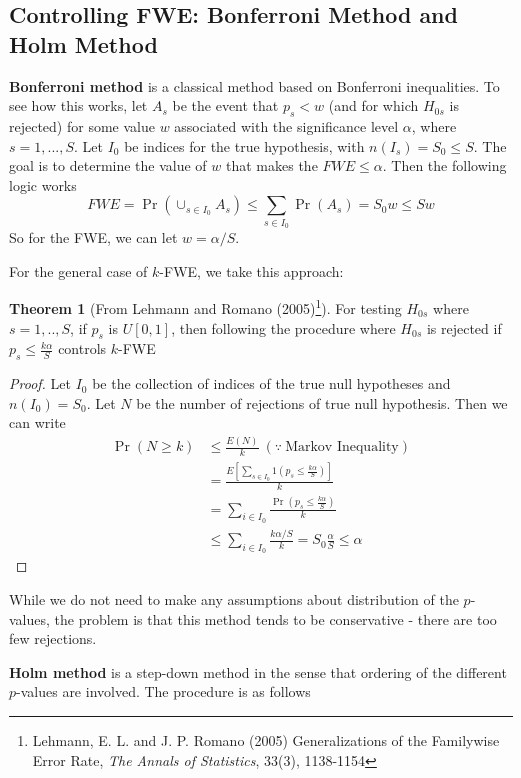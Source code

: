 \documentclass[12pt]{article}
\theoremstyle{definition}
\theoremstyle{property}
\theoremstyle{assumption}
\theoremstyle{example}
\theoremstyle{comment}
\newtheorem{theorem}{Theorem}[section]
\begin{document}
\subsection{Controlling FWE: Bonferroni Method and Holm Method}\textbf{Bonferroni method} is a classical method based on Bonferroni inequalities. To see how this works, let $A_s$ be the event that $p_s<w$ (and for which $H_{0s}$ is rejected) for some value $w$ associated with the significance level $\alpha$, where $s=1,...,S$. Let $I_0$ be indices for the true hypothesis, with $n(I_s)=S_0\leq S.$ The goal is to determine the value of $w$ that makes the $FWE\leq\alpha$.  Then the following logic works
\[
FWE = \Pr(\cup_{s\in I_0}A_s)\leq \sum_{s\in I_0}\Pr(A_s) = S_0 w \leq S w
\]
So for the FWE, we can let $w=\alpha/S$. \par
 For the general case of $k$-FWE, we take this approach:
\begin{mdframed}[backgroundcolor=green!5] 
\begin{theorem}[From Lehmann and Romano (2005)\footnote{Lehmann, E. L. and J. P. Romano (2005) Generalizations of the Familywise Error Rate, \textit{The Annals of Statistics}, 33(3), 1138-1154}]  For testing $H_{0s}$ where $s=1,..,S$, if $p_s$ is $U[0,1]$, then following the procedure where $H_{0s}$ is rejected if $p_s\leq \frac{k\alpha}{S}$ controls $k$-FWE
\begin{proof}
Let $I_0$ be the collection of indices of the true null hypotheses and $n(I_0)=S_0$. Let $N$ be the number of rejections of true null hypothesis. Then we can write
\begin{align*}
\Pr(N\geq k)& \leq \frac{E(N)}{k} \ (\because \ \text{Markov Inequality})\\
& = \frac{E\left[\sum_{s\in I_0} 1\left(p_s\leq \frac{k\alpha}{S}\right)\right]}{k}\\
&=\sum_{i\in I_0}\frac{\Pr\left(p_s \leq \frac{k\alpha}{S} \right)}{k}\\
&\leq \sum_{i\in I_0}\frac{k\alpha /S}{k} = S_0\frac{\alpha}{S}\leq \alpha
\end{align*}
\end{proof}
\end{theorem}
\end{mdframed} \par
While we do not need to make any assumptions about distribution of the $p$-values, the problem is that this method tends to be conservative - there are too few rejections. \par
\textbf{Holm method} is a step-down method in the sense that ordering of the different $p$-values are involved. The procedure is as follows
\end{document}
